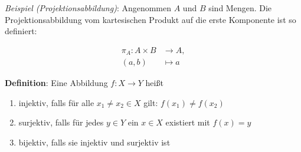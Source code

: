 \documentclass{article}
\begin{document}
\emph{Beispiel (Projektionsabbildung)}: Angenommen $A$ und $B$ sind Mengen. Die Projektionsabbildung vom
kartesischen Produkt auf die erste Komponente ist so definiert:

\begin{align*}
\pi_{A}: A \times B &\to A, \\
(a,b) &\mapsto a\
\end{align*}

\textbf{Definition}: Eine Abbildung $f:X \to Y$ heißt

\begin{enumerate}
\item injektiv, falls für alle $x_1 \ne x_2 \in X$ gilt: $f(x_1) \ne f(x_2)$
\item surjektiv, falls für jedes $y \in Y$ ein $x \in X$ existiert mit $f(x) = y$
\item bijektiv, falls sie injektiv und surjektiv ist
\end{enumerate}
\end{document}
